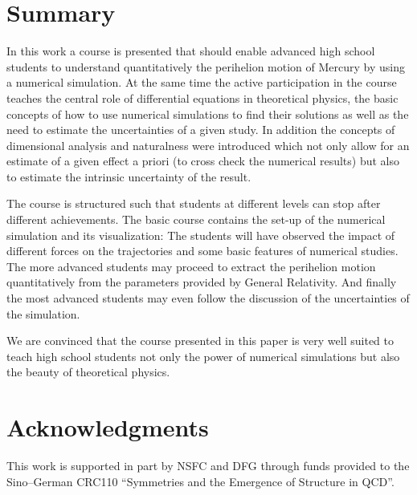\documentclass[12pt,ngerman,american]{iopart}
\begin{document}
\section{Summary}

In this work a course is presented that should enable advanced high school students to understand quantitatively the perihelion motion of Mercury
by using a numerical simulation. At the same time the active participation in the course teaches the central role of 
differential equations in theoretical physics, the basic concepts of how to use numerical simulations to find their
solutions as well as the need to estimate the uncertainties of a given study.
In addition the concepts of dimensional analysis and naturalness were introduced which not only allow for an
estimate of a given effect a priori (to cross check the numerical results) but also to estimate the intrinsic uncertainty
of the result.

The course is structured such that students at different levels can stop after different achievements. The basic
course contains the set-up of the numerical simulation and its visualization: The students will have observed
the impact of different forces on the trajectories and some basic features of numerical studies.
The more advanced students may proceed to extract the perihelion motion quantitatively from the 
parameters provided by General Relativity. And finally the most advanced students may even follow the 
discussion of the uncertainties of the simulation. 

We are convinced that the course presented in this paper is very well suited to teach high school students not
only the power of numerical simulations but also the beauty of theoretical physics.


\section*{Acknowledgments}

This work is supported in part by NSFC and DFG through funds provided to the
Sino--German CRC110 ``Symmetries and the Emergence of Structure in QCD''.


\end{document}
